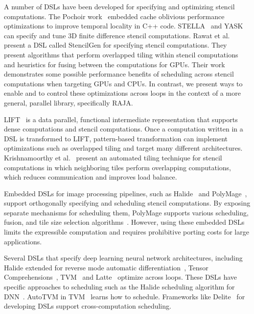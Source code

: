 \documentclass{article}
\begin{document}
A number of DSLs have been developed for specifying and
optimizing stencil computations.
The Pochoir work~\cite{Tang2011} embedded cache oblivious performance
optimizations to improve temporal locality in C++ code.
STELLA~\cite{Gysi2015}  and YASK~\cite{YASK2016} can specify and 
tune 3D finite difference stencil computations.
Rawat et al.~\cite{Rawat18} present a DSL called StencilGen for specifying
stencil computations.
They present algorithms that perform overlapped tiling within stencil
computations and heuristics for fusing between the computations for GPUs.
Their work demonstrates some possible performance benefits of scheduling
across stencil computations when targeting GPUs and CPUs. In contrast,
we present ways to enable and to control these optimizations across loops
in the context of a more general, parallel library, specifically RAJA.

LIFT~\cite{Hagedorn2018} is a data parallel, functional intermediate
representation that supports dense computations and stencil computations.
Once a computation written in a DSL is transformed to LIFT, pattern-based
transformation can implement optimizations such as overlapped tiling and
target many different architectures.
Krishnamoorthy et al.~\cite{Krishnamoorthy07} present an automated tiling
technique for stencil computations in which neighboring tiles perform
overlapping computations, which reduces communication and improves load
balance.

Embedded DSLs for image processing pipelines, such as
Halide~\cite{Ragan-Kelley2012,Ragan-Kelley2013} and
PolyMage~\cite{Mullapudi2015}, support orthogonally specifying and
scheduling stencil computations.
By exposing separate mechanisms for scheduling them, PolyMage supports
various scheduling, fusion, and tile size selection
algorithms~\cite{Mullapudi2016,Jangda2018,Adams2019}.
However, using these embedded DSLs limits the expressible computation and requires prohibitive porting costs for large applications.

Several DSLs that specify deep learning neural network
architectures, including Halide extended for reverse mode automatic
differentiation~\cite{Li2018}, Tensor Comprehensions~\cite{Vasilache2018},
TVM~\cite{TVM2018} and Latte~\cite{TruongLatte2016} optimize across loops.
These DSLs have specific approaches to scheduling such as the Halide scheduling
algorithm for DNN~\cite{Yang2020}.
AutoTVM in TVM~\cite{Chen2019} learns how to schedule.
Frameworks like Delite~\cite{Sujeeth2014} for developing DSLs support 
cross-computation scheduling.
\end{document}
